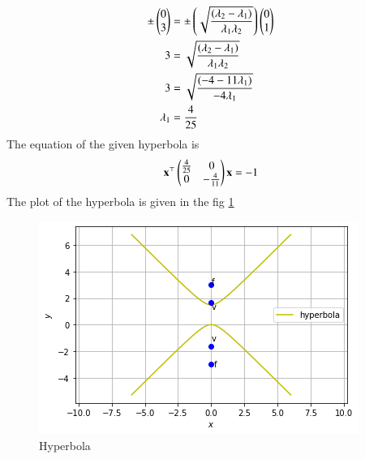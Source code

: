 \documentclass[journal,12pt,twocolumn]{IEEEtran}
\begin{document}
\begin{align}
    \pm \begin{pmatrix}0\\ 3\end{pmatrix} &= \pm \left(\sqrt{\frac{(\lambda_2-\lambda_1)}{\lambda_1 \lambda_2}}\right) \begin{pmatrix}0\\1\end{pmatrix}\\
    3 &= \sqrt{\frac{(\lambda_2-\lambda_1)}{\lambda_1 \lambda_2}}\\
    3 &= \sqrt{\frac{(-4-11\lambda_1)}{-4\lambda_1 }}\\
    \lambda_1 &= \frac{4}{25}
\end{align}
The equation of the given hyperbola is
\begin{equation}
    \mathbf{x}^{\top}\begin{pmatrix}\frac{4}{25} & 0 \\ 0 & -\frac{4}{11}\end{pmatrix}\mathbf{x} = -1
\end{equation}
The plot of the hyperbola is given in the fig \ref{fig:1}
\begin{figure}[H]
\centering
\includegraphics[width= \columnwidth]{Hyperbola5.png}
\caption{Hyperbola} \label{fig:1}
\end{figure}
\end{document}
